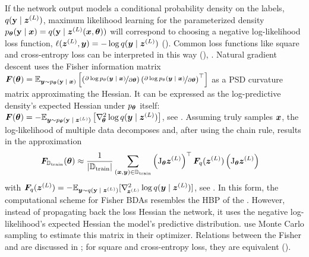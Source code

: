 If the network output models a conditional probability density on the labels,
$q({\mathbf{y}}\;|\;{\bm{z}}^{(L)})$, maximum likelihood learning for the
parameterized density $p_{\bm{\theta}} ({\mathbf{y}}\;|\;{\bm{x}}) =
q({\mathbf{y}}\;|\;{\bm{z}}^{(L)}({\bm{x}}, {\bm{\theta}}))$ will correspond to choosing a
negative log-likelihood loss function, \ie $\ell({\bm{z}}^{(L)}, {\bm{y}}) = - \log
q({\bm{y}}\;|\;{\bm{z}}^{(L)})$
(). Common loss functions like
square and cross-entropy loss can be interpreted in this way
(),
. Natural gradient descent \citep{amari1998natural} uses the Fisher information
matrix
\begin{math}
  {\bm{F}}({\bm{\theta}})
  =
  \mathbb{E}_{{\bm{y}} \sim p_{\bm{\theta}}({\mathbf{y}}\;|\;{\bm{x}})}
  \left[\left(\nicefrac{\partial \log
        p_\theta({\bm{y}}\;|\;{\bm{x}})}{\partial {\bm{\theta}}} \right)
    \left(\nicefrac{\partial \log
        p_\theta({\bm{y}}\;|\;{\bm{x}})}{\partial {\bm{\theta}}} \right)^\top
  \right]
\end{math}
as a PSD curvature matrix approximating the Hessian. It can be expressed as the
log-predictive density's expected Hessian under $p_{{\bm{\theta}}}$ itself:
${\bm{F}}({\bm{\theta}}) = - \mathbb{E}_{{\bm{y}} \sim p_{{\bm{\theta}}}({\mathbf{y}}\;|\;{\bm{z}}^{(L)})}\left[
  \nabla_{\!{{\bm{\theta}}}}^{2} \log q({\bm{y}}\;|\;{\bm{z}}^{(L)}) \right]$, see
. Assuming truly \iid samples
${\bm{x}}$, the log-likelihood of multiple data decomposes and, after using the chain
rule, results in the approximation
\begin{align*}
  {\bm{F}}_{{\mathbb{D}}_{\text{train}}}({\bm{\theta}})
  &\approx
    \dfrac{1}{|{\mathbb{D}}_{\text{train}}|}
    \sum_{({\bm{x}}, {\bm{y}}) \in {\mathbb{D}}_{\text{train}}}
    \left( \mathrm{J}_{{\bm{\theta}}} {\bm{z}}^{(L)}\right)^\top
    {\bm{F}}_{q}({\bm{z}}^{(L)})
    \left( \mathrm{J}_{{\bm{\theta}}} {\bm{z}}^{(L)}\right)
\end{align*}
with ${\bm{F}}_q({\bm{z}}^{(L)}) = - \mathbb{E}_{{\bm{y}} \sim q({\mathbf{y}}\;|\;{\bm{z}}^{(L)})}[
\nabla_{\!{{\bm{z}}^{(L)}}}^{2} \log q({\bm{y}}\;|\;{\bm{z}}^{(L)})]$, see
. In this form, the computational
scheme for Fisher BDAs resembles the HBP of the \ggn. However, instead of
propagating back the loss Hessian \wrt the network, it uses the negative
log-likelihood's expected Hessian the model's predictive distribution.
\citet{martens2015optimizing} use Monte Carlo sampling to estimate this matrix
in their \KFAC optimizer. Relations between the Fisher and \ggn are discussed in
\citep{pascanu2013revisiting, martens2014new}; for square and cross-entropy
loss, they are equivalent ().

